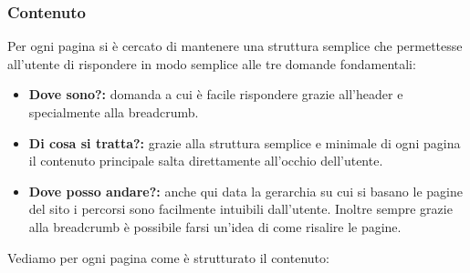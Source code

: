 \subsubsection{Contenuto}
Per ogni pagina si è cercato di mantenere una struttura semplice che permettesse all'utente di rispondere in modo semplice alle tre domande fondamentali:
    \begin{itemize}
        \item \textbf{Dove sono?:} domanda a cui è facile rispondere grazie all'header e specialmente alla breadcrumb.
        \item \textbf{Di cosa si tratta?:} grazie alla struttura semplice e minimale di ogni pagina il contenuto principale salta direttamente all'occhio dell'utente.
        \item \textbf{Dove posso andare?:} anche qui data la gerarchia su cui si basano le pagine del sito i percorsi sono facilmente intuibili dall'utente. Inoltre sempre grazie alla breadcrumb è possibile farsi un'idea di come risalire le pagine.
    \end{itemize}
Vediamo per ogni pagina come è strutturato il contenuto:
